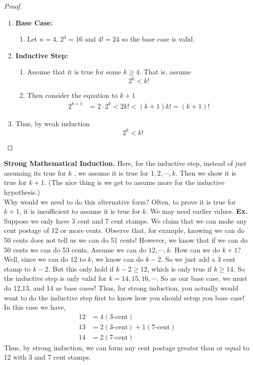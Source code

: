 \documentclass[class=article, crop=false]{standalone}
\begin{document}
\begin{proof}
	$ $\\
	\begin{enumerate}
		\item[] \textbf{Base Case:}
			\begin{enumerate}
				\item[] Let $n=4$, $2^4 = 16$ and $4!=24$ so the base case is valid.
			\end{enumerate} 
		\item[] \textbf{Inductive Step:}
			\begin{enumerate}
				\item[] Assume that it is true for some $k\geq 4$. That is, assume $$2^k < k!$$
				\item[] Then consider the equation to $k+1$
					\begin{align*}
						2^{k+1} &= 2 \cdot 2^k < 2k! < (k+1)k! = (k+1)!
					\end{align*}
			\end{enumerate}
		\item[] Thus, by weak induction $$2^k < k!$$
	\end{enumerate}
\end{proof}
\noindent\textbf{Strong Mathematical Induction.} Here, for the inductive step, instead of just assuming its true for $k$
, we assume it is true for $1,2,\cdots,k$. Then we show it is true for $k+1$. (The nice thing is we get to assume more for the inductive hypothesis.)\\
Why would we need to do this alternative form? Often, to prove it is true for $k+1$, it is insufficient to assume it is true
for $k$. We may need earlier values.
\textbf{Ex.} Suppose we only have 3 cent and 7 cent stamps. We claim that we can make any cent postage of 12 or more cents.
Observe that, for example, knowing we can do 50 cents does not tell us we can do 51 cents! However, we know that if we can do
50 cents we can do 53 cents. Assume we can do $12,\cdots,k$. How can we do $k+1$? Well, since we can do $12$ to $k$, we
know can do $k-2$. So we just add a 3 cent stamp to $k-2$. But this only hold if $k-2\geq 12$, which is only true if $k\geq 14$.
So the inductive step is only valid for $k=14,15,16,\cdots$. So as our base case, we must do 12,13, and 14 as base cases!
Thus, for strong induction, you actually would want to do the inductive step first to know how you should setup you base case!
In this case we have, 
\begin{align*}
	12 &= 4 (3\text{-cent}) \\
	13 &= 2 (3\text{-cent}) + 1 (7\text{-cent}) \\
	14 &= 2 (7\text{-cent})
\end{align*}
Thus, by strong induction, we can form any cent postage greater than or equal to 12 with 3 and 7 cent stamps.
\end{document}
